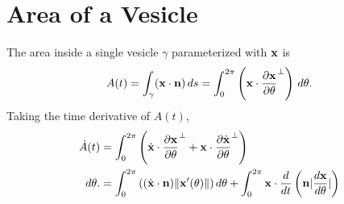 \documentclass[aps,prl,showpacs]{revtex4}
\begin{document}
\section{Area of a Vesicle}
The area inside a single vesicle $\gamma$ parameterized with $\mathbf{x}$ is
\begin{align}
  A(t) = \int_{\gamma} (\mathbf{x} \cdot \mathbf{n})\, ds = 
    \int_{0}^{2\pi} \left(\mathbf{x} \cdot \frac{\partial \mathbf{x}}{\partial \theta}^\perp\right)
    \, d\theta.
\end{align}
Taking the time derivative of $A(t)$,
\begin{align}
  \dot{A}(t) &= \int_{0}^{2\pi} \left(
    \dot{\mathbf{x}} \cdot \frac{\partial \mathbf{x}}{\partial \theta}^{\perp} + 
    \mathbf{x} \cdot \frac{\partial \dot{\mathbf{x}}}{\partial \theta}^{\perp}\right) \\
    \, d\theta.
  &= \int_{0}^{2\pi} \left(
    (\dot{\mathbf{x}} \cdot \mathbf{n})\|\mathbf{x}'(\theta)\| \right) d\theta +
     \int_{0}^{2\pi}
    \mathbf{x} \cdot \frac{d}{dt}\left(\mathbf{n} |\frac{d\mathbf{x}}{d\theta}| \right)
\end{align}
\end{document}
